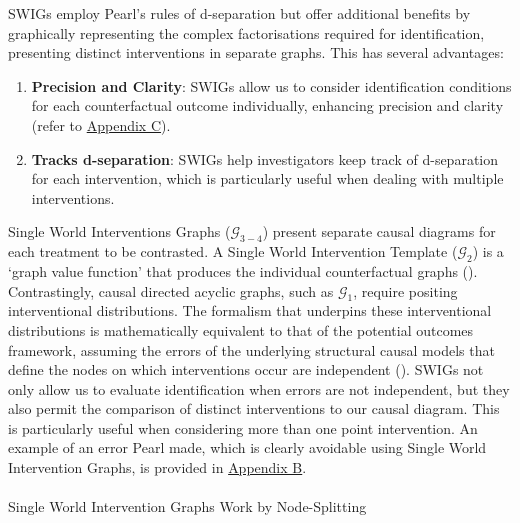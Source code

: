 \documentclass[
  single column]{article}
\makeatletter
\let\oldparagraph\paragraph
\renewcommand{\paragraph}{
    \@ifstar
      \xxxParagraphStar
      \xxxParagraphNoStar
  }
\newcommand{\xxxParagraphStar}[1]{\oldparagraph*{#1}\mbox{}}
\newcommand{\xxxParagraphNoStar}[1]{\oldparagraph{#1}\mbox{}}
\providecommand{\tightlist}{%
  \setlength{\itemsep}{0pt}\setlength{\parskip}{0pt}}\usepackage{longtable,booktabs,array}
\makeatother
\begin{document}
SWIGs employ Pearl's rules of d-separation but offer additional benefits
by graphically representing the complex factorisations required for
identification, presenting distinct interventions in separate graphs.
This has several advantages:

\begin{enumerate}
\def\labelenumi{\arabic{enumi}.}
\tightlist
\item
  \textbf{Precision and Clarity}: SWIGs allow us to consider
  identification conditions for each counterfactual outcome
  individually, enhancing precision and clarity (refer to
  \hyperref[id-app-c]{Appendix C}).
\item
  \textbf{Tracks d-separation}: SWIGs help investigators keep track of
  d-separation for each intervention, which is particularly useful when
  dealing with multiple interventions.
\end{enumerate}

\begin{table}

\caption{\label{tbl-swigtable}Single World Interventions Graphs
(\(\mathcal{G}_{3-4}\)) present separate causal diagrams for each
treatment to be contrasted. A Single World Intervention Template
(\(\mathcal{G}_{2}\)) is a `graph value function' that produces the
individual counterfactual graphs
().
Contrastingly, causal directed acyclic graphs, such as
\(\mathcal{G}_1\), require positing interventional distributions. The
formalism that underpins these interventional distributions is
mathematically equivalent to that of the potential outcomes framework,
assuming the errors of the underlying structural causal models that
define the nodes on which interventions occur are independent
(). SWIGs not
only allow us to evaluate identification when errors are not
independent, but they also permit the comparison of distinct
interventions to our causal diagram. This is particularly useful when
considering more than one point intervention. An example of an error
Pearl made, which is clearly avoidable using Single World Intervention
Graphs, is provided in \hyperref[id-app-b]{Appendix B}.}

\centering{

\swigtable

}

\end{table}%

\paragraph{Single World Intervention Graphs Work by
Node-Splitting}\label{single-world-intervention-graphs-work-by-node-splitting}
\end{document}

